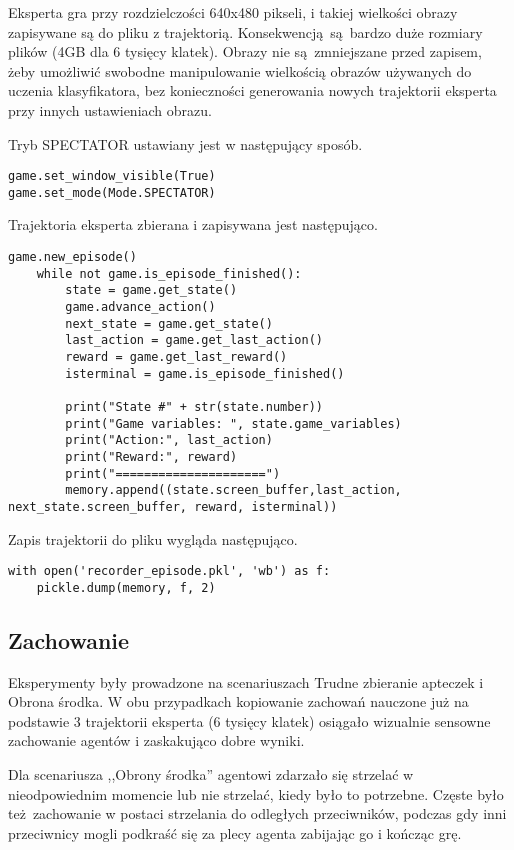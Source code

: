 Eksperta gra przy rozdzielczości 640x480 pikseli, i takiej wielkości obrazy zapisywane są do pliku z trajektorią. Konsekwencją są bardzo duże rozmiary plików (4GB dla 6 tysięcy klatek). Obrazy nie są zmniejszane przed zapisem, żeby umożliwić swobodne manipulowanie wielkością obrazów używanych do uczenia klasyfikatora, bez konieczności generowania nowych trajektorii eksperta przy innych ustawieniach obrazu.

\vspace{5mm}

Tryb SPECTATOR ustawiany jest w następujący sposób.
\begin{lstlisting}[language=iPython]
game.set_window_visible(True)
game.set_mode(Mode.SPECTATOR)
\end{lstlisting}

Trajektoria eksperta zbierana i zapisywana jest następująco.

\begin{lstlisting}[language=iPython]
    game.new_episode()
    while not game.is_episode_finished():
        state = game.get_state()
        game.advance_action()
        next_state = game.get_state()
        last_action = game.get_last_action()
        reward = game.get_last_reward()
        isterminal = game.is_episode_finished()

        print("State #" + str(state.number))
        print("Game variables: ", state.game_variables)
        print("Action:", last_action)
        print("Reward:", reward)
        print("=====================")
        memory.append((state.screen_buffer,last_action, next_state.screen_buffer, reward, isterminal))
\end{lstlisting}

Zapis trajektorii do pliku wygląda następująco.

\begin{lstlisting}[language=iPython]
with open('recorder_episode.pkl', 'wb') as f:
    pickle.dump(memory, f, 2)
\end{lstlisting}

\subsection{Zachowanie}
Eksperymenty były prowadzone na scenariuszach Trudne zbieranie apteczek i Obrona środka.
W obu przypadkach kopiowanie zachowań nauczone już na podstawie 3 trajektorii eksperta (6 tysięcy klatek) osiągało wizualnie sensowne zachowanie agentów i zaskakująco dobre wyniki.

Dla scenariusza ,,Obrony środka'' agentowi zdarzało się strzelać w nieodpowiednim momencie lub nie strzelać, kiedy było to potrzebne. Częste było też zachowanie w postaci strzelania do odległych przeciwników, podczas gdy inni przeciwnicy mogli podkraść się za plecy agenta zabijając go i kończąc grę.

